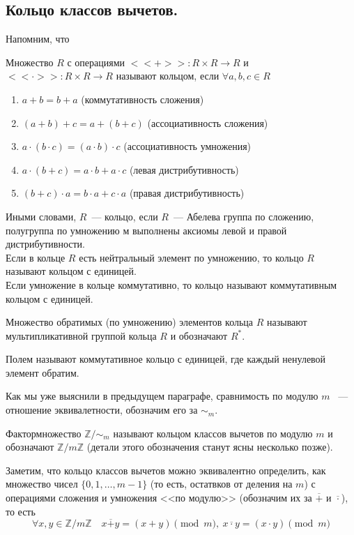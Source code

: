 \documentclass[11pt]{article}
\begin{document}
\subsection{Кольцо классов вычетов.}
Напомним, что
\begin{definition}
	Множество $R$ с операциями $<<+>>\colon R \times R \to R$ и $<<\cdot>>\colon R \times R \to R$  называют кольцом, если
	$\forall a, b, c \in R$
	\begin{enumerate}
	    \item $a + b = b + a$ (коммутативность сложения)

		\item $(a + b) + c = a + (b + c)$ (ассоциативность сложения)

		\item $a \cdot (b \cdot c) = (a \cdot b) \cdot c$ (ассоциативность умножения)

		\item $a \cdot (b + c) = a \cdot b + a \cdot c$ (левая дистрибутивность)

		\item $(b + c) \cdot a = b \cdot a + c \cdot a$ (правая дистрибутивность)
	\end{enumerate}
	Иными словами, $R$~--- кольцо, если $R$~--- Абелева группа по сложению, полугруппа по умножению м выполнены аксиомы левой и правой
	дистрибутивности. \\
	Если в кольце $R$ есть нейтральный элемент по умножению, то кольцо $R$ называют кольцом с единицей. \\
	Если умножение в кольце коммутативно, то кольцо называют коммутативным кольцом с единицей. \\
\end{definition}
\begin{definition}
	Множество обратимых (по умножению) элементов кольца $R$ называют мультипликативной группой кольца $R$ и обозначают $R^{*}$.
\end{definition}
\begin{definition}
	Полем называют коммутативное кольцо с единицей, где каждый ненулевой элемент обратим.
\end{definition}

Как мы уже выяснили в предыдущем параграфе, сравнимость по модулю $m$ ~--- отношение эквивалетности, обозначим его за $\sim_{m}$.

\begin{definition}

	Фактормножество $\mathbb{Z}/\sim_{m}$ называют кольцом классов вычетов по модулю $m$ и обозначают $\mathbb{Z}/m\mathbb{Z}$ (детали этого обозначения станут ясны несколько позже).

\end{definition}
\begin{remark}

    Заметим, что кольцо классов вычетов можно эквивалентно определить, как множество чисел $\{ 0, 1, \ldots, m - 1\}$ (то есть, остатвков от деления на $m$) с операциями сложения и умножения <<по модулю>> (обозначим их за $\overline{+}$ и $\overline{\cdot}$), то есть
	\[ \forall x, y \in \mathbb{Z}/m\mathbb{Z} \quad x \overline{+} y = (x + y)\pmod{m}, \ x \overline{\cdot} y = (x \cdot y)\pmod{m} \]

\end{remark}
\end{document}
